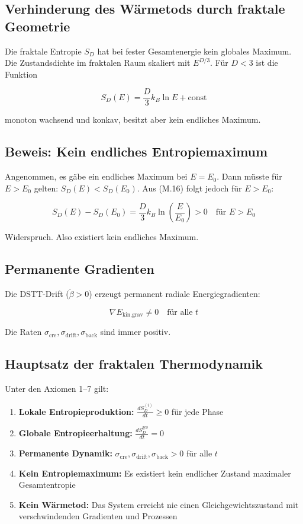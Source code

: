 \subsection{Verhinderung des Wärmetods durch fraktale Geometrie}

Die fraktale Entropie $S_D$ hat bei fester Gesamtenergie kein globales Maximum. 
Die Zustandsdichte im fraktalen Raum skaliert mit $E^{D/3}$. Für $D < 3$ ist die 
Funktion

\[
S_D(E) = \frac{D}{3}k_B \ln E + \text{const} \tag{M.16}
\]

monoton wachsend und konkav, besitzt aber kein endliches Maximum.

\subsection{Beweis: Kein endliches Entropiemaximum}

Angenommen, es gäbe ein endliches Maximum bei $E = E_0$. Dann müsste für $E > E_0$ 
gelten: $S_D(E) < S_D(E_0)$. Aus (M.16) folgt jedoch für $E > E_0$:

\[
S_D(E) - S_D(E_0) = \frac{D}{3}k_B \ln \left( \frac{E}{E_0} \right) > 0 \quad \text{für } E > E_0 \tag{M.17}
\]

Widerspruch. Also existiert kein endliches Maximum.

\subsection{Permanente Gradienten}

Die DSTT-Drift ($\dot{\beta} > 0$) erzeugt permanent radiale Energiegradienten:

\[
\nabla E_{\text{kin,grav}} \neq 0 \quad \text{für alle } t \tag{M.18}
\]

Die Raten $\sigma_{\text{cre}}, \sigma_{\text{drift}}, \sigma_{\text{back}}$ sind immer positiv.

\subsection{Hauptsatz der fraktalen Thermodynamik}

Unter den Axiomen 1–7 gilt:

\begin{enumerate}
    \item \textbf{Lokale Entropieproduktion:} $\displaystyle \frac{dS_D^{(i)}}{dt} \geq 0$ für jede Phase
    \item \textbf{Globale Entropieerhaltung:} $\displaystyle \frac{dS_D^{\text{ges}}}{dt} = 0$
    \item \textbf{Permanente Dynamik:} $\sigma_{\text{cre}}, \sigma_{\text{drift}}, \sigma_{\text{back}} > 0$ für alle $t$
    \item \textbf{Kein Entropiemaximum:} Es existiert kein endlicher Zustand maximaler Gesamtentropie
    \item \textbf{Kein Wärmetod:} Das System erreicht nie einen Gleichgewichtszustand mit verschwindenden Gradienten und Prozessen
\end{enumerate}

